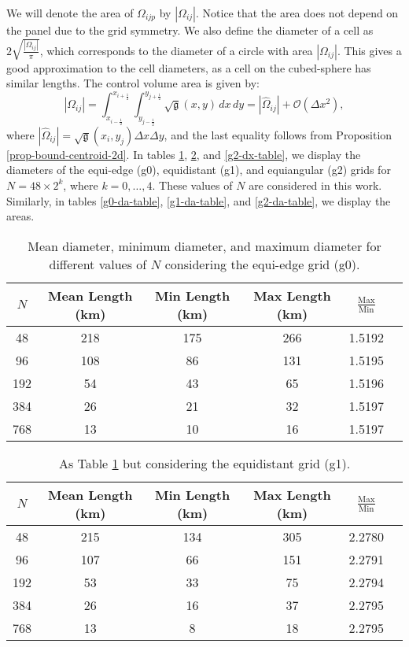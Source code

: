 We will denote the area of $\Omega_{ijp}$ by $|\Omega_{ij}|$.
Notice that the area does not depend on the panel due to the grid symmetry.
We also define the diameter of a cell as $2\sqrt{\frac{|\Omega_{ij}|}{\pi}}$, which corresponds to the diameter of a circle with area $|\Omega_{ij}|$.
This gives a good approximation to the cell diameters, as a cell on the cubed-sphere has similar lengths.
The control volume area is given by:
\begin{equation}
	\label{chp4-area}
	|\Omega_{ij}| = \int_{x_{i-\frac{1}{2}}}^{x_{i+\frac{1}{2}}} \int_{y_{j-\frac{1}{2}}}^{y_{j+\frac{1}{2}}}{\sqrt{\mathfrak{g}}(x,y)} \,dx \,dy = 
	|\hat{\Omega}_{ij}| + \mathcal{O}(\Delta x^2),
\end{equation}
where $|\hat{\Omega}_{ij}| = \sqrt{\mathfrak{g}}(x_i,y_j) \Delta x \Delta y$,
and the last equality follows from Proposition \ref{prop-bound-centroid-2d}.
In tables \ref{g0-dx-table}, \ref{g1-dx-table}, and \ref{g2-dx-table},
we display the diameters of the  equi-edge (g0), equidistant (g1), and equiangular (g2) grids for $N=48\times 2^k$, 
where $k = 0,\ldots, 4$. These values of $N$ are considered in this work.
Similarly, in tables \ref{g0-da-table}, \ref{g1-da-table}, and \ref{g2-da-table}, we display the areas.


\begin{table}[htbp]
    \centering
    \caption{Mean diameter, minimum diameter, and maximum diameter for different values of $N$ considering the equi-edge grid (g0).\label{g0-dx-table}}
    \begin{tabular}{cccccc}
        \toprule
        $N$ & Mean Length (km) & Min Length (km) & Max Length (km) & $\frac{\text{Max}}{\text{Min}}$ \\
        \midrule
        48 & 218 & 175 & 266 & 1.5192 \\
        96 & 108 & 86 & 131 & 1.5195 \\
        192 & 54 & 43 & 65 & 1.5196 \\
        384 & 26 & 21 & 32 & 1.5197 \\
        768 & 13 & 10 & 16 & 1.5197 \\
        \bottomrule
    \end{tabular}
\end{table}

\begin{table}[htbp]
    \centering
    \caption{As Table \ref{g0-dx-table} but considering the equidistant grid (g1). \label{g1-dx-table}}
    \begin{tabular}{cccccc}
        \toprule
        $N$ & Mean Length (km) & Min Length (km) & Max Length (km) & $\frac{\text{Max}}{\text{Min}}$ \\
        \midrule
        48 & 215 & 134 & 305 & 2.2780 \\
        96 & 107 & 66 & 151 & 2.2791 \\
        192 & 53 & 33 & 75 & 2.2794 \\
        384 & 26 & 16 & 37 & 2.2795 \\
        768 & 13 & 8 & 18 & 2.2795 \\
        \bottomrule
    \end{tabular}
\end{table}

